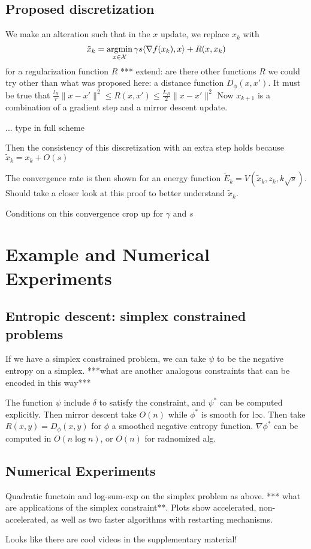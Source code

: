 \documentclass{article}
\newcommand{\argmin}{\operatornamewithlimits{argmin}}
\begin{document}
\subsection{Proposed discretization}
We make an alteration such that in the $x$ update, we replace $x_k$ with 
\[\tilde x_k = \argmin_{x\in\mathcal X} \gamma s \langle \nabla f(x_k), x \rangle + R(x,x_k)  \]
for a regularization function $R$ *** extend: are there other functions $R$ we could try other than what was proposed here: a distance function $D_\phi (x,x')$. It must be true that $\frac{l_R}{r} \|x-x'\|^2 \leq R(x,x') \leq \frac{L_R}{2} \|x-x'\|^2$
Now $x_{k+1}$ is a combination of a gradient step and a mirror descent update.

... type in full scheme

Then the consistency of this discretization with an extra step holds because $\tilde x_k = x_k + O(s)$

The convergence rate is then shown for an energy function $\tilde E_k = V(\tilde x_k, z_k, k\sqrt{s})$. Should take a closer look at this proof to better understand $\tilde x_k$.

Conditions on this convergence crop up for $\gamma$ and $s$

\section{Example and Numerical Experiments}
\subsection{Entropic descent: simplex constrained problems}
If we have a simplex constrained problem, we can take $\psi$ to be the negative entropy on a simplex. ***what are another analogous constraints that can be encoded in this way***

The function $\psi$ include $\delta$ to satisfy the constraint, and $\psi^*$ can be computed explicitly. Then mirror descent take $O(n)$ while $\phi^*$ is smooth for l$\infty$. Then take $R(x,y) = D_\phi(x,y)$ for $\phi$ a smoothed negative entropy function. $\nabla \phi^*$ can be computed in $O(n\log n)$, or $O(n)$ for radnomized alg. 

\subsection{Numerical Experiments}
Quadratic functoin and log-sum-exp on the simplex problem as above. *** what are applications of the simplex constraint**. Plots show accelerated, non-accelerated, as well as two faster algorithms with restarting mechanisms. 

Looks like there are cool videos in the supplementary material!

%
%
\end{document}
